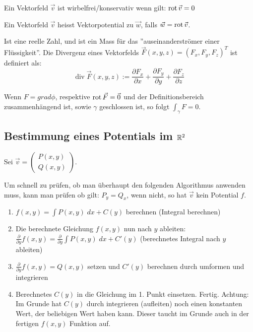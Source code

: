 \begin{definition}
Ein Vektorfeld $\vec{v}$ ist wirbelfrei/konservativ wenn gilt: $\operatorname{rot} \vec{v} = 0$
\end{definition}

\begin{definition}[Vektorpotential]
Ein Vektorfeld $\vec{v}$ heisst Vektorpotential zu $\vec{w}$, falls $\vec{w} = \operatorname{rot} \vec{v}$.
\end{definition}

\begin{definition}[Divergenz]
Ist eine reelle Zahl, und ist ein Mass für das ''auseinanderströmer einer Flüssigkeit''. 
Die Divergenz eines Vektorfelds $\vec{F}(x, y, z) = (F_x, F_y, F_z)^T$ ist definiert als:
\[
	\operatorname{div} \vec{F}(x,y,z) := \frac{\partial F_x}{\partial x} + \frac{\partial F_y}{\partial y} + 
	\frac{\partial F_z}{\partial z}
\] 
\end{definition}

\begin{lemma}
Wenn $F = grad \phi$, respektive $\operatorname{rot} \vec{F} =\vec{0}$ und der Definitionsbereich zusammenhängend ist,
sowie $\gamma$ geschlossen ist, so folgt $\int_\gamma F = 0$.
\end{lemma}

\subsection{Bestimmung eines Potentials im $\mathbb{R}^2$}
Sei $\vec{v} = \begin{pmatrix}
P(x,y)\\
Q(x,y)
\end{pmatrix}$.

Um schnell zu prüfen, ob man überhaupt den folgenden Algorithmus anwenden muss,
kann man prüfen ob gilt: $P_y = Q_x$, wenn nicht, so hat $\vec{v}$ kein Potential $f$.

\begin{enumerate}[itemsep=1em]
	\item $f(x,y) = \int P(x,y)\;dx + C(y)$ berechnen (Integral berechnen)
	\item Die berechnete Gleichung $f(x,y)$ nun nach $y$ ableiten:
	$\frac{\partial}{\partial y} f(x,y) = \frac{\partial}{\partial y}\int P(x,y)\;dx + C'(y)$
	(berechnetes Integral nach $y$ ableiten)
	\item $\frac{\partial}{\partial y} f(x,y) = Q(x,y)$ setzen und $C'(y)$ berechnen durch umformen
	und integrieren
	\item Berechnetes $C(y)$ in die Gleichung im 1. Punkt einsetzen. Fertig. Achtung: Im Grunde hat
	$C(y)$ durch integrieren (aufleiten) noch einen konstanten Wert, der beliebigen Wert haben kann.
	Dieser taucht im Grunde auch in der fertigen $f(x,y)$ Funktion auf.
\end{enumerate}

